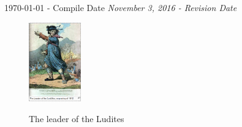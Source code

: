 \begin{titlepage}


{\large \today{ - Compile Date } \textsl{November 3, 2016 - Revision Date}}\\[3cm] %

%
%
\begin{figure}[!h]
\centering
\href{https://en.wikipedia.org/wiki/Luddite}{\includegraphics[width=0.2\textwidth]{figures/ludite_leader}}
\caption{The leader of the Ludites}
\label{title_page_1_ludites}
\end{figure}
 

\vfill %

\end{titlepage}